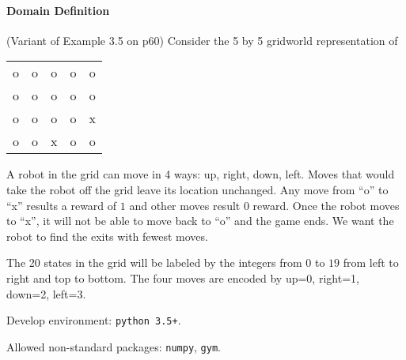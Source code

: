 
\paragraph{Domain Definition}
(Variant of Example 3.5 on p60) Consider the 5 by 5 gridworld representation of
\begin{center}
    \begin{tabular}{ccccc}
         o & o & o & o & o\\
         o & o & o & o & o\\
         o & o & o & o & x\\
         o & o & x & o & o\\
    \end{tabular}
\end{center}
A robot in the grid can move in 4 ways: up, right, down, left. Moves that
would take the robot off the grid leave its location unchanged.  Any move from
``o'' to ``x'' results a reward of $ 1 $ and other moves result $ 0 $ reward.
Once the robot moves to ``x'', it will not be able to move back to ``o'' and
the game ends. We want the robot to find the exits with fewest moves.

The 20 states in the grid will be labeled by the integers
from $ 0 $ to $ 19 $ from left to right and top to bottom. The four moves
are encoded by up=0, right=1, down=2, left=3.

Develop environment: \texttt{python 3.5+}.

Allowed non-standard packages: \texttt{numpy}, \texttt{gym}.

